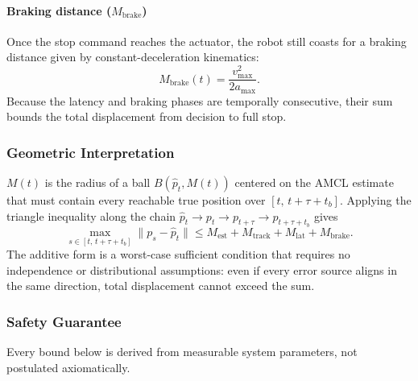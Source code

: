 \documentclass[journal,twoside,web]{ieeecolor}
\begin{document}
\paragraph{Braking distance ($M_{\mathrm{brake}}$)}
Once the stop command reaches the actuator, the robot still coasts for a braking distance given by constant-deceleration kinematics:
\begin{equation}
M_{\mathrm{brake}}(t) = \frac{v_{\max}^2}{2a_{\max}}.
\end{equation}
Because the latency and braking phases are temporally consecutive, their sum bounds the total displacement from decision to full stop.

\subsubsection{Geometric Interpretation}
$M(t)$ is the radius of a ball $B(\hat{p}_t, M(t))$ centered on the AMCL estimate that must contain every reachable true position over $[t,\, t{+}\tau{+}t_b]$. Applying the triangle inequality along the chain $\hat{p}_t \to p_t \to p_{t+\tau} \to p_{t+\tau+t_b}$ gives
\begin{equation}
\max_{s \in [t,\, t+\tau+t_b]} \|p_s - \hat{p}_t\| \le M_{\mathrm{est}} + M_{\mathrm{track}}
          + M_{\mathrm{lat}} + M_{\mathrm{brake}}.
\label{eq:triangle}
\end{equation}
The additive form is a worst-case sufficient condition that requires no independence or distributional assumptions: even if every error source aligns in the same direction, total displacement cannot exceed the sum.

\subsubsection{Safety Guarantee}\label{sec:formal}
Every bound below is derived from measurable system parameters, not postulated axiomatically.
\end{document}
